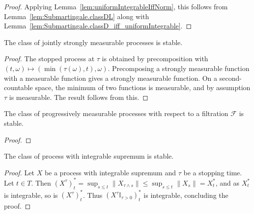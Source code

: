 \begin{proof}
Applying Lemma~\ref{lem:uniformIntegrableIffNorm}, this follows from Lemma~\ref{lem:Submartingale.classDL} along with Lemma~\ref{lem:Submartingale.classD_iff_uniformIntegrable}.
\end{proof}

\begin{lemma}\label{lem:isStable_jointlyStronglyMeasurable}
  \leanok
The class of jointly strongly measurable processes is stable.
\end{lemma}
\begin{proof}
The stopped process at $\tau$ is obtained by precomposition with $(t, \omega) \mapsto (\min (\tau(\omega), t), \omega)$.
Precomposing a strongly measurable function with a measurable function gives a strongly measurable function.
On a second-countable space, the minimum of two functions is measurable, and by assumption $\tau$ is measurable.
The result follows from this.
\end{proof}

\begin{lemma}\label{lem:isStable_progMeasurable}
  \leanok
The class of progressively measurable processes with respect to a filtration $\mathcal{F}$ is stable.
\end{lemma}

\begin{proof}\leanok
\end{proof}


\begin{lemma}\label{lem:isStable_hasIntegrableSup}
  \leanok
The class of process with integrable supremum is stable.
\end{lemma}

\begin{proof}\leanok
Let $X$ be a process with integrable supremum and $\tau$ be a stopping time. Let $t \in T$. Then $(X^\tau)^*_t = \sup_{s \le t} \|X_{\tau \land s}\| \le \sup_{s \le t} \|X_s\| = X^*_t$, and as $X^*_t$ is integrable, so is $(X^\tau)^*_t$. Thus $(X^\tau \mathbb{I}_{\tau > 0})^*_t$ is integrable, concluding the proof.
\end{proof}

